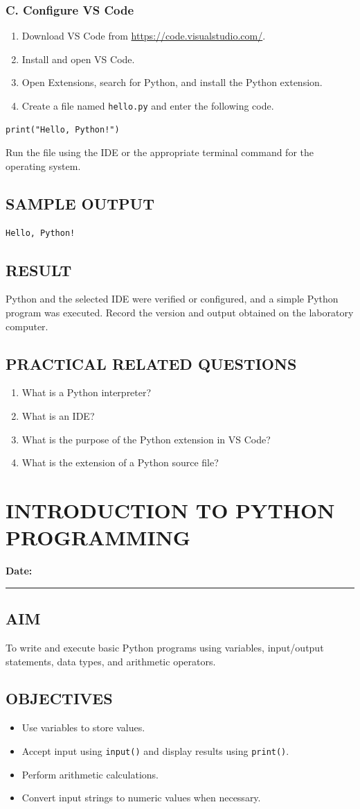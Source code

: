 \documentclass[12pt,a4paper]{report}
\newcommand{\experimentdate}{\hfill\textbf{Date:} \rule{3cm}{0.4pt}}
\newcommand{\aim}[1]{\section*{AIM}#1}
\newcommand{\result}[1]{\section*{RESULT}#1}
\newcommand{\questions}[1]{\section*{PRACTICAL RELATED QUESTIONS}#1}
\newcommand{\sampleoutput}{\section*{SAMPLE OUTPUT}}
\begin{document}
\subsection*{C. Configure VS Code}
\begin{enumerate}
\item Download VS Code from \url{https://code.visualstudio.com/}.
\item Install and open VS Code.
\item Open Extensions, search for Python, and install the Python extension.
\item Create a file named \texttt{hello.py} and enter the following code.
\end{enumerate}

\begin{lstlisting}
print("Hello, Python!")
\end{lstlisting}

Run the file using the IDE or the appropriate terminal command for the operating system.

\sampleoutput
\begin{verbatim}
Hello, Python!
\end{verbatim}

\result{Python and the selected IDE were verified or configured, and a simple Python program was executed. Record the version and output obtained on the laboratory computer.}

\questions{
\begin{enumerate}
\item What is a Python interpreter?
\item What is an IDE?
\item What is the purpose of the Python extension in VS Code?
\item What is the extension of a Python source file?
\end{enumerate}}

\chapter{INTRODUCTION TO PYTHON PROGRAMMING}
\experimentdate

\aim{To write and execute basic Python programs using variables, input/output statements, data types, and arithmetic operators.}

\section*{OBJECTIVES}
\begin{itemize}
\item Use variables to store values.
\item Accept input using \texttt{input()} and display results using \texttt{print()}.
\item Perform arithmetic calculations.
\item Convert input strings to numeric values when necessary.
\end{itemize}
\end{document}
